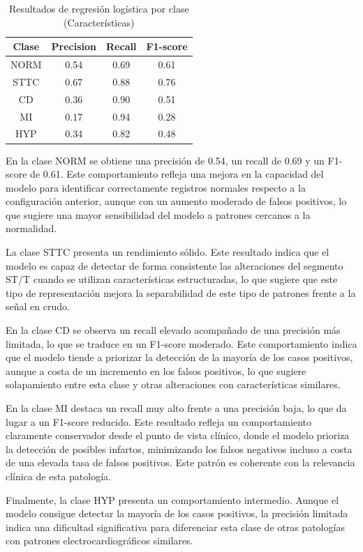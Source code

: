 \documentclass[12pt,a4paper,twoside]{book}
\begin{document}
\begin{table}[H]
	\centering
	\begin{tabular}{|c|c|c|c|}
	\hline
	\textbf{Clase} & \textbf{Precision} & \textbf{Recall} & \textbf{F1-score} \\
	\hline
	NORM & 0.54 & 0.69 & 0.61 \\
	STTC & 0.67 & 0.88 & 0.76 \\
	CD   & 0.36 & 0.90 & 0.51 \\
	MI   & 0.17 & 0.94 & 0.28 \\
	HYP  & 0.34 & 0.82 & 0.48 \\
	\hline
	\end{tabular}
	\caption{Resultados de regresión logística por clase (Características)}
	\label{tab:metrics_clase_lr_feat}
\end{table}

En la clase NORM se obtiene una precisión de 0.54, un recall de 0.69 y un F1-score de 0.61. 
Este comportamiento refleja una mejora en la capacidad del modelo para identificar correctamente registros normales respecto a la configuración anterior, aunque con un aumento moderado de falsos positivos, lo que sugiere una mayor sensibilidad del modelo a patrones cercanos a la normalidad.

La clase STTC presenta un rendimiento sólido. 
Este resultado indica que el modelo es capaz de detectar de forma consistente las alteraciones del segmento ST/T cuando se utilizan características estructuradas, lo que sugiere que este tipo de representación mejora la separabilidad de este tipo de patrones frente a la señal en crudo.

En la clase CD se observa un recall elevado acompañado de una precisión más limitada, lo que se traduce en un F1-score moderado. 
Este comportamiento indica que el modelo tiende a priorizar la detección de la mayoría de los casos positivos, aunque a costa de un incremento en los falsos positivos, lo que sugiere solapamiento entre esta clase y otras alteraciones con características similares.

En la clase MI destaca un recall muy alto frente a una precisión baja, lo que da lugar a un F1-score reducido. 
Este resultado refleja un comportamiento claramente conservador desde el punto de vista clínico, donde el modelo prioriza la detección de posibles infartos, minimizando los falsos negativos incluso a costa de una elevada tasa de falsos positivos. 
Este patrón es coherente con la relevancia clínica de esta patología.

Finalmente, la clase HYP presenta un comportamiento intermedio. 
Aunque el modelo consigue detectar la mayoría de los casos positivos, la precisión limitada indica una dificultad significativa para diferenciar esta clase de otras patologías con patrones electrocardiográficos similares.
\end{document}
